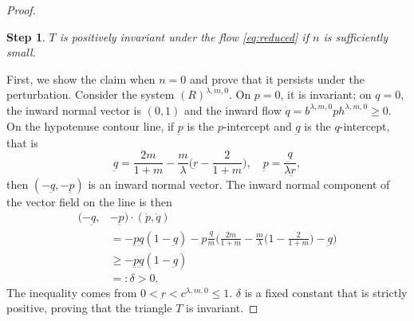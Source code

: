 \documentclass[a4paper,11pt]{article}
\newcounter{dummy}
\newtheorem{step}{Step}[dummy]
\numberwithin{step}{dummy}
\begin{document}
\begin{proof}
\medskip
\begin{step}
 $T$ is positively invariant under the flow \eqref{eq:reduced} if $n$ is sufficiently small.
\end{step}
First, we show the claim when $n=0$ and prove that it persists under the perturbation. Consider the system $(R)^{\lambda,m,0}$. On $p=0$, it is invariant; on $q=0$, the inward normal vector is $(0,1)$ and the inward flow $\dot{q} = b^{ \lambda,m,0}ph^{ \lambda,m,0} \ge 0$. On the hypotenuse contour line, if $\underbar{p}$ is the $p$-intercept and $\underbar{q}$ is the $q$-intercept, that is
$$ \underbar{q} = \frac{2m}{1+m}-\frac{m}{ \lambda } \big( \underbar{r} - \frac{2}{1+m} \big), \quad \underbar{p} = \frac{ \underbar{q} }{ \lambda \underbar{r} },$$
then $(-\underbar{q}, -\underbar{p})$ is an inward normal vector.
The inward normal component of the vector field on the line is then
\begin{align*} 
 (-\underbar{q}, &-\underbar{p}) \cdot ( \dot{p}, \dot{q} ) \\
 &=-\underbar{p}\underbar{q}(1-\underbar{q}) - p \frac{\underbar{q}}{m}\Big( \frac{2m}{1+m} - \frac{m}{ \lambda} \big( 1-\frac{2}{1+m} \big) - \underbar{q}\Big)\\
 &\ge -\underbar{p}\underbar{q}(1-\underbar{q}) \\%
 &=: \delta >0.
\end{align*}
The inequality comes from $0<\underbar{r} < c^{ \lambda,m,0} \le 1$. $\delta$ is a fixed constant that is strictly positive, proving that the triangle $T$ is invariant.


\end{proof}
\end{document}
